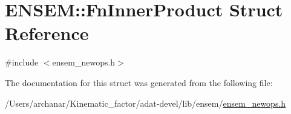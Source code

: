 \hypertarget{structENSEM_1_1FnInnerProduct}{}\section{E\+N\+S\+EM\+:\+:Fn\+Inner\+Product Struct Reference}
\label{structENSEM_1_1FnInnerProduct}


{\ttfamily \#include $<$ensem\+\_\+newops.\+h$>$}



The documentation for this struct was generated from the following file\+:\begin{DoxyCompactItemize}
\item 
/\+Users/archanar/\+Kinematic\+\_\+factor/adat-\/devel/lib/ensem/\mbox{\hyperlink{adat-devel_2lib_2ensem_2ensem__newops_8h}{ensem\+\_\+newops.\+h}}\end{DoxyCompactItemize}
